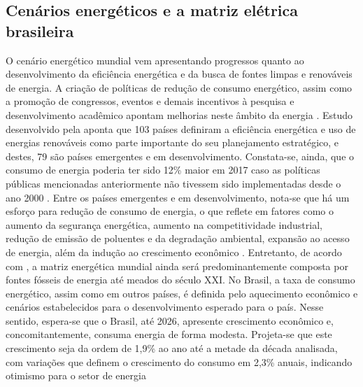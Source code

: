 \subsection{Cenários energéticos e a matriz elétrica brasileira}
\begin{onehalfspace}
    O cenário energético mundial vem apresentando progressos quanto ao desenvolvimento da 
    eficiência energética e da busca de fontes limpas e renováveis de energia. A criação de 
    políticas de redução de consumo energético, assim como a promoção de congressos, eventos 
    e demais incentivos à pesquisa e desenvolvimento acadêmico apontam melhorias neste âmbito 
    da energia \cite{InternationalEnergyAgency-IEA2014}.\vspace{0.3cm} \newline
    Estudo desenvolvido pela \textcite{UnitedNations2017} aponta que 103 países definiram 
    a eficiência energética e uso de energias renováveis como parte importante do seu 
    planejamento estratégico, e destes, 79 são países emergentes e em desenvolvimento. 
    Constata-se, ainda, que o consumo de energia poderia ter sido 12\% maior em 2017 caso as 
    políticas públicas mencionadas anteriormente não tivessem sido implementadas desde o ano 
    2000 \cite{InternationalEnergyAgency-IEA2019b}.\vspace{0.3cm} \newline
    Entre os países emergentes e em desenvolvimento, nota-se que há um esforço para redução 
    de consumo de energia, o que reflete em fatores como o aumento da segurança energética, 
    aumento na competitividade industrial, redução de emissão de poluentes e da degradação 
    ambiental, expansão ao acesso de energia, além da indução ao crescimento econômico 
    \cite{BancoMundial2018}. Entretanto, de acordo com \textcite{Abramovay2010,Abramovay2014}, 
    a matriz energética mundial ainda será predominantemente composta por fontes fósseis de 
    energia até meados do século XXI.\vspace{0.3cm} \newline
    No Brasil, a taxa de consumo energético, assim como em outros países, é definida pelo 
    aquecimento econômico e cenários estabelecidos para o desenvolvimento esperado para o país. 
    Nesse sentido, espera-se que o Brasil, até 2026, apresente crescimento econômico e, 
    concomitantemente, consuma energia de forma modesta. Projeta-se que este crescimento seja 
    da ordem de 1,9\% ao ano até a metade da década analisada, com variações que definem o 
    crescimento do consumo em 2,3\% anuais, indicando otimismo para o setor de energia 

\end{onehalfspace}
